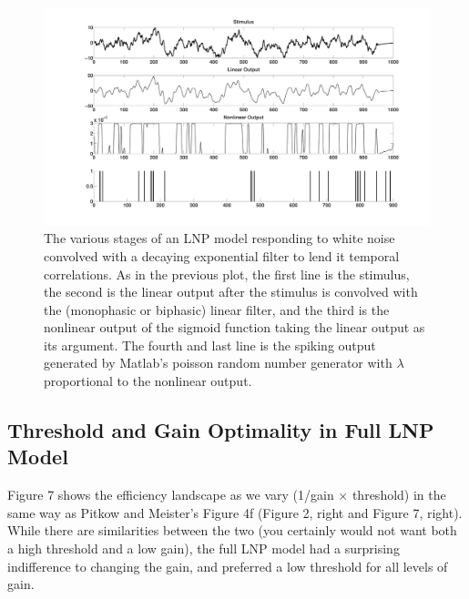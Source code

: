 \documentclass[12pt]{article}
\begin{document}
\begin{figure}[h!!]
\includegraphics[width=\textwidth]{lnp_pink.pdf}
\caption{The various stages of an LNP model responding to white noise convolved with a decaying exponential filter to lend it temporal correlations.  As in the previous plot, the first line is the stimulus, the second is the linear output after the stimulus is convolved with the (monophasic or biphasic) linear filter, and the third is the nonlinear output of the sigmoid function taking the linear output as its argument.  The fourth and last line is the spiking output generated by Matlab's poisson random number generator with $\lambda$ proportional to the nonlinear output.}
\label{Figure 6}
\end{figure}


\subsection{Threshold and Gain Optimality in Full LNP Model}
Figure 7 shows the efficiency landscape as we vary (1/gain $\times$ threshold) in the same way as Pitkow and Meister's Figure 4f (Figure 2, right and Figure 7, right).  While there are similarities between the two (you certainly would not want both a high threshold and a low gain), the full LNP model had a surprising indifference to changing the gain, and preferred a low threshold for all levels of gain.
\end{document}
